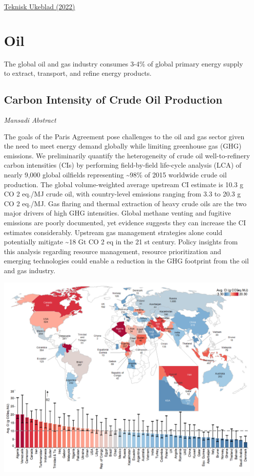\documentclass[
]{book}
\begin{document}
\href{https://www.tu.no/artikler/seaborg-utvikler-mobile-kjernekraftverk/516722}{Teknisk Ukeblad (2022)}

\hypertarget{oil}{%
\chapter{Oil}\label{oil}}

The global oil and gas industry consumes 3-4\% of global primary energy supply to extract,
transport, and refine energy products.

\hypertarget{carbon-intensity-of-crude-oil-production}{%
\section{Carbon Intensity of Crude Oil Production}\label{carbon-intensity-of-crude-oil-production}}

\emph{Mansadi Abstract}

The goals of the Paris Agreement pose challenges
to the oil and gas sector given the need to meet energy demand globally while limiting
greenhouse gas (GHG) emissions. We preliminarily quantify the heterogeneity of crude oil
well-to-refinery carbon intensities (CIs) by performing field-by-field life-cycle analysis
(LCA) of nearly 9,000 global oilfields representing \textasciitilde98\% of 2015 worldwide crude oil
production. The global volume-weighted average upstream CI estimate is 10.3 g
CO 2 eq./MJ crude oil, with country-level emissions ranging from 3.3 to 20.3 g CO 2 eq./MJ.
Gas flaring and thermal extraction of heavy crude oils are the two major drivers of high
GHG intensities. Global methane venting and fugitive emissions are poorly documented,
yet evidence suggests they can increase the CI estimates considerably. Upstream gas
management strategies alone could potentially mitigate \textasciitilde18 Gt CO 2 eq in the 21 st century.
Policy insights from this analysis regarding resource management, resource prioritization
and emerging technologies could enable a reduction in the GHG footprint from the oil and
gas industry.

\includegraphics{fig/carbon_intensity_of_crude_oil_production.png}
\end{document}
